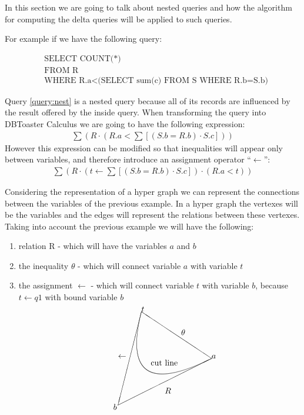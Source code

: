 \documentclass[12pt]{article}
\begin{document}
In this section we are going to talk about nested queries and how the algorithm for computing the delta queries will be applied to such queries. 

For example if we have the following query:

\begin{align}
\label{query:nest}
&\mbox{SELECT COUNT(*) }\\
&\mbox{FROM R}\nonumber\\
&\mbox{WHERE R.a}<\mbox{(SELECT sum(c) FROM S WHERE R.b=S.b)}\nonumber
\end{align}

Query \ref{query:nest} is a nested query because all of its records are influenced by the result offered by the inside query. When transforming the query into DBToaster Calculus we are going to have the following expression:
\begin{align}
\sum(R\cdot(R.a<\sum[(S.b=R.b)\cdot S.c]))
\end{align}
However this expression can be modified so that inequalities will appear only between variables, and therefore introduce an assignment operator ``$\gets$'':
\begin{align}
\label{form}\sum(R\cdot(t\gets\sum[(S.b=R.b)\cdot S.c])\cdot(R.a<t))
\end{align}

Considering the representation of a hyper graph we can represent the connections between the variables of the previous example. In a hyper graph the vertexes will be the variables and the edges will represent the relations between these vertexes. Taking into account the previous example we will have the following:
\begin{enumerate}
\item relation R - which will have the variables $a$ and $b$
\item the inequality $\theta$ - which will connect variable $a$ with variable $t$
\item the assignment $\gets$ - which will connect variable $t$ with variable $b$, because $t\gets q1$ with bound variable $b$
\end{enumerate}
\begin{align}
\label{hyper}
\setlength{\unitlength}{1mm}
\begin{picture}(50,50)
\put(50,30){\line(-3,2){30}}
\put(20,50){\line(-1,-4){10}}
\put(10,10){\line(2,1){40}}
\qbezier(50,30)(10,10)(20,50)
\put(50,30){$a$}
\put(20,50){$t$}
\put(8,8){$b$}
\put(30,15){$R$}
\put(37,40){$\theta$}
\put(10,30){$\gets$}
\put(24,27){\mbox{cut line}}
\end{picture}
\end{align}
\end{document}
